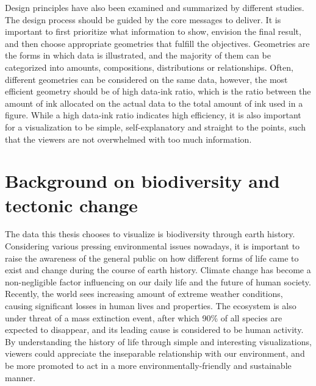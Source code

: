 \documentclass[11pt, a4paper,oneside,chapterprefix=false]{scrbook}
\begin{document}
Design principles have also been examined and summarized by different studies. The design process should be guided by the core messages to deliver. It is important to first prioritize what information to show, envision the final result, and then choose appropriate geometries that fulfill the objectives. Geometries are the forms in which data is illustrated, and the majority of them can be categorized into amounts, compositions, distributions or relationships. Often, different geometries can be considered on the same data, however, the most efficient geometry should be of high data-ink ratio, which is the ratio between the amount of ink allocated on the actual data to the total amount of ink used in a figure. While a high data-ink ratio indicates high efficiency, it is also important for a visualization to be simple, self-explanatory  and straight to the points, such that the viewers are not overwhelmed with too much information. \\


\section{Background on biodiversity and tectonic change} \label{sec: two}
The data this thesis chooses to visualize is biodiversity through earth history. Considering various pressing environmental issues nowadays, it is important to raise the awareness of the general public on how different forms of life came to exist and change during the course of earth history. Climate change has become a non-negligible factor influencing on our daily life and the future of human society. Recently, the world sees increasing amount of extreme weather conditions, causing significant losses in human lives and properties. The ecosystem is also under threat of a mass extinction event, after which 90\% of all species are expected to disappear, and its leading cause is considered to be human activity. 
By understanding the history of life through simple and interesting visualizations, viewers could appreciate the inseparable relationship with our environment, and be more promoted to act in a more environmentally-friendly and sustainable manner.
\end{document}
